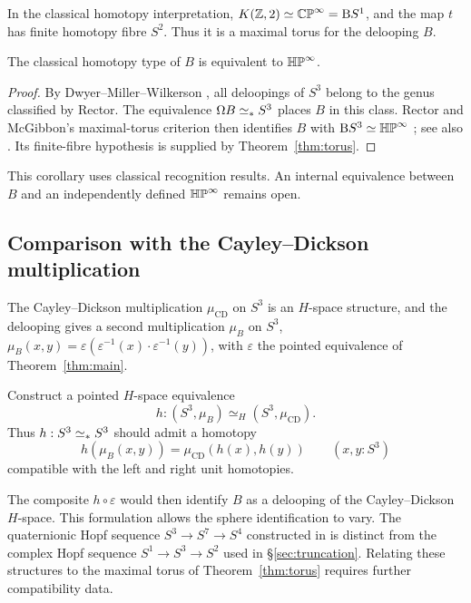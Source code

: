 In the classical homotopy interpretation, $K(\mathbb Z,2)\simeq\mathbb{CP}^\infty=\mathrm B S^1$, and the map $t$ has finite homotopy fibre $S^2$. Thus it is a maximal torus for the delooping $B$.

\begin{corollary}
The classical homotopy type of $B$ is equivalent to $\mathbb{HP}^\infty$.
\end{corollary}
\begin{proof}
By Dwyer--Miller--Wilkerson \cite[Thm.~1.1 and Rem.~1.2]{dmw}, all deloopings of $S^3$ belong to the genus classified by Rector. The equivalence $\Omega B\simeq_* S^3$ places $B$ in this class. Rector and McGibbon's maximal-torus criterion then identifies $B$ with $\mathrm B S^3\simeq\mathbb{HP}^\infty$ \cite{rector,mcgibbon}; see also \cite[Thm.~1.1(4)]{yaumaps}. Its finite-fibre hypothesis is supplied by Theorem~\ref{thm:torus}.
\end{proof}
This corollary uses classical recognition results. An internal equivalence between $B$ and an independently defined $\mathbb{HP}^\infty$ remains open.

\subsection{Comparison with the Cayley--Dickson multiplication}

The Cayley--Dickson multiplication $\mu_{\mathrm{CD}}$ on $S^3$ \cite{cayley} is an $H$-space structure, and the delooping gives a second multiplication $\mu_B$ on $S^3$, $\mu_B(x,y)=\varepsilon(\varepsilon^{-1}(x)\cdot\varepsilon^{-1}(y))$, with $\varepsilon$ the pointed equivalence of Theorem~\ref{thm:main}.

\begin{problem}\label{prob:CD}
Construct a pointed $H$-space equivalence
\[
h:(S^3,\mu_B)\simeq_H(S^3,\mu_{\mathrm{CD}}).
\]
Thus $h:S^3\simeq_* S^3$ should admit a homotopy
\[
h(\mu_B(x,y))=\mu_{\mathrm{CD}}(h(x),h(y))
\qquad(x,y:S^3)
\]
compatible with the left and right unit homotopies.
\end{problem}

The composite $h\circ\varepsilon$ would then identify $B$ as a delooping of the Cayley--Dickson $H$-space. This formulation allows the sphere identification to vary. The quaternionic Hopf sequence $S^3\to S^7\to S^4$ constructed in \cite{cayley} is distinct from the complex Hopf sequence $S^1\to S^3\to S^2$ used in \S\ref{sec:truncation}. Relating these structures to the maximal torus of Theorem~\ref{thm:torus} requires further compatibility data.

